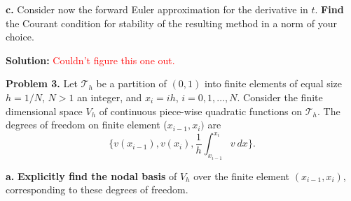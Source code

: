 \documentclass[11pt]{article}
\begin{document}
\vskip 2cm



{\bf c.} Consider now the forward Euler approximation for the derivative in $t$. {\bf Find} the Courant condition for stability of the resulting method in a norm of your choice.

\vskip 1cm

\textbf{Solution:} \textcolor{red}{Couldn't figure this one out.}


\newpage



\textbf{Problem 3.}  Let $\mathcal{T}_h$ be a partition of $(0, 1)$ into finite elements of equal size $h = 1/N$,
$N > 1$ an integer, and $x_i = ih$, $i = 0, 1, \ldots , N$.
Consider the finite dimensional space $V_h$ of continuous piece-wise quadratic functions on $\mathcal{T}_h$. 
The degrees of freedom on finite element ($x_{i-1}, x_i)$ are 
\begin{equation} \label{degree_of_freedom}
    \Big\{ v(x_{i-1}), v(x_i), \frac{1}{h} \int_{x_{i-1}}^{x_i} v \: dx \Big\}.
\end{equation}

\vskip 1cm


\textbf{a.} \textbf{Explicitly find the nodal basis} of $V_h$ over the finite element $(x_{i-1}, x_i)$, corresponding to these degrees of freedom.

\vskip 1cm 
\end{document}
